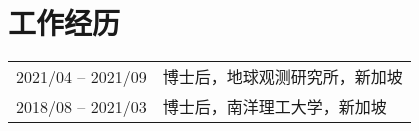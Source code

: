 \section*{工作经历}
\begin{tabular}{p{} p{}}
2021/04 -- 2021/09 & 博士后，地球观测研究所，新加坡 \\
2018/08 -- 2021/03 & 博士后，南洋理工大学，新加坡 \\
\end{tabular}
